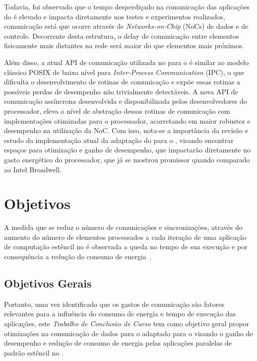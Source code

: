 Todavia, foi observado que o tempo desperdiçado na comunicação das aplicações do \mppa é elevado e impacta diretamente nos testes e experimentos realizados, comunicação está que ocorre através de \textit{Networks-on-Chip} (NoCs) de dados e de controle. Decorrente desta estrutura, o delay de comunicação entre elementos fisicamente mais distantes na rede será maior do que elementos mais próximos.

Além disso, a atual API de comunicação utilizada no \pskel para o \mppa é similar ao modelo clássico POSIX de baixo nível para \textit{Inter-Process Communication} (IPC), o que dificulta o desenvolvimento de rotinas de comunicação e expõe essas rotinas a possíveis perdas de desempenho não trivialmente detectáveis. A nova API de comunicação assíncrona desenvolvida e disponibilizada pelos desenvolvedores do processador, eleva o nível de abstração dessas rotinas de comunicação com implementações otimizadas para o processador, acarretando em maior robustez e desempenho na utilização da NoC. Com isso, nota-se a importância da revisão e estudo da implementação atual da adaptação do \fw \pskel para o \mppa, visando encontrar espaços para otimização e ganho de desempenho, que impactarão diretamente no gasto energético do processador, que já se mostrou promissor quando comparado ao Intel Broadwell. 

\section{Objetivos}
\label{sec:objetivos}
A medida que se reduz o número de comunicações e sincronizações, através do aumento do número de elementos processados a cada iteração de uma aplicação de computação estêncil no \mppa é observada a queda no tempo de sua execução e por consequência a redução do consumo de energia~\cite{wscad2017}.

\subsection{Objetivos Gerais}
\label{subsec:objetivos-gerais}

 Portanto, uma vez identificado que os gastos de comunicação são fatores relevantes para a influência do consumo de energia e tempo de execução das aplicações, este \textit{Trabalho de Conclusão de Curso} tem como objetivo geral propor otimizações na comunicação de dados para o \fw \pskel adaptado para o \mppa visando o ganho de desempenho e redução de consumo de energia pelas aplicações paralelas de padrão estêncil no \mppa.


